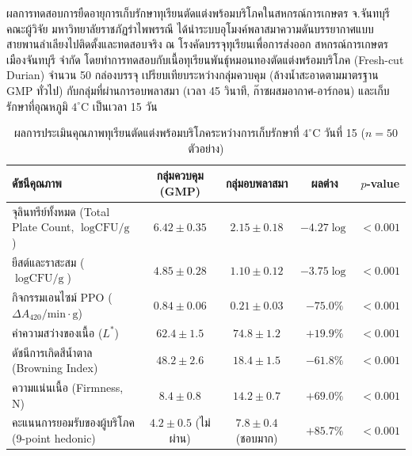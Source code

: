 \begin{agribox}{ผลการทดสอบการยืดอายุการเก็บรักษาทุเรียนตัดแต่งพร้อมบริโภคในสหกรณ์การเกษตร จ.จันทบุรี}
คณะผู้วิจัย มหาวิทยาลัยราชภัฏรำไพพรรณี ได้นำระบบอุโมงค์พลาสมาความดันบรรยากาศแบบสายพานลำเลียงไปติดตั้งและทดสอบจริง ณ โรงคัดบรรจุทุเรียนเพื่อการส่งออก สหกรณ์การเกษตรเมืองจันทบุรี จำกัด โดยทำการทดสอบกับเนื้อทุเรียนพันธุ์หมอนทองตัดแต่งพร้อมบริโภค (Fresh-cut Durian) จำนวน 50 กล่องบรรจุ เปรียบเทียบระหว่างกลุ่มควบคุม (ล้างน้ำสะอาดตามมาตรฐาน GMP ทั่วไป) กับกลุ่มที่ผ่านการอบพลาสมา (เวลา 45 วินาที, ก๊าซผสมอากาศ-อาร์กอน) และเก็บรักษาที่อุณหภูมิ $4^\circ\text{C}$ เป็นเวลา 15 วัน

\begin{table}[H]
\centering
\small
\caption{ผลการประเมินคุณภาพทุเรียนตัดแต่งพร้อมบริโภคระหว่างการเก็บรักษาที่ $4^\circ\text{C}$ วันที่ 15 ($n = 50$ ตัวอย่าง)}
\label{tab:ch06_durian_postharvest}
\begin{tabular}{lcccc}
\toprule
\textbf{ดัชนีคุณภาพ} & \textbf{กลุ่มควบคุม (GMP)} & \textbf{กลุ่มอบพลาสมา} & \textbf{ผลต่าง} & \textbf{$p$-value} \\
\midrule
จุลินทรีย์ทั้งหมด (Total Plate Count, $\log\text{CFU/g}$) & $6.42 \pm 0.35$ & $\mathbf{2.15 \pm 0.18}$ & $-4.27 \log$ & $<0.001$ \\
ยีสต์และราสะสม ($\log\text{CFU/g}$) & $4.85 \pm 0.28$ & $\mathbf{1.10 \pm 0.12}$ & $-3.75 \log$ & $<0.001$ \\
กิจกรรมเอนไซม์ PPO ($\Delta A_{420}/\text{min}\cdot\text{g}$) & $0.84 \pm 0.06$ & $\mathbf{0.21 \pm 0.03}$ & $-75.0\%$ & $<0.001$ \\
ค่าความสว่างของเนื้อ ($L^*$) & $62.4 \pm 1.5$ & $\mathbf{74.8 \pm 1.2}$ & $+19.9\%$ & $<0.001$ \\
ดัชนีการเกิดสีน้ำตาล (Browning Index) & $48.2 \pm 2.6$ & $\mathbf{18.4 \pm 1.5}$ & $-61.8\%$ & $<0.001$ \\
ความแน่นเนื้อ (Firmness, N) & $8.4 \pm 0.8$ & $\mathbf{14.2 \pm 0.7}$ & $+69.0\%$ & $<0.001$ \\
คะแนนการยอมรับของผู้บริโภค (9-point hedonic) & $4.2 \pm 0.5$ (ไม่ผ่าน) & $\mathbf{7.8 \pm 0.4}$ (ชอบมาก) & $+85.7\%$ & $<0.001$ \\
\bottomrule
\end{tabular}
\end{table}


\end{agribox}
